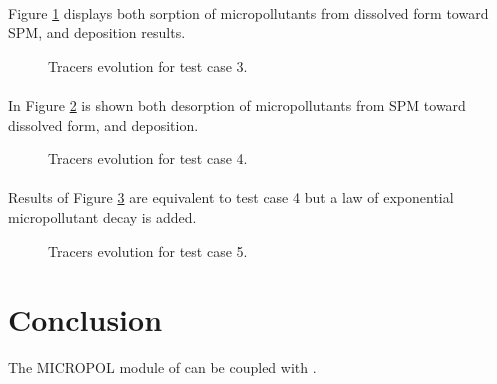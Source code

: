 \paragraph{}
Figure \ref{fig:waq2d_micropol:kin2_3} displays both sorption of micropollutants
from dissolved form toward SPM, and deposition results.

\begin{figure} [H]
\centering
{}
\caption{Tracers evolution for test case 3.}
 \label{fig:waq2d_micropol:kin2_3}
\end{figure}

\paragraph{}
In Figure \ref{fig:waq2d_micropol:kin2_4} is shown both desorption
of micropollutants from SPM toward dissolved form, and deposition.

\begin{figure} [H]
\centering
{}
 \caption{Tracers evolution for test case 4.}
 \label{fig:waq2d_micropol:kin2_4}
\end{figure}

\paragraph{}
Results of Figure \ref{fig:waq2d_micropol:kin2_5} are equivalent to test
case 4 but a law of exponential micropollutant decay is added.

\begin{figure} [H]
\centering
{}
 \caption{Tracers evolution for test case 5.}
 \label{fig:waq2d_micropol:kin2_5}
\end{figure}

\section{Conclusion}

The MICROPOL module of \waqtel can be coupled with .
